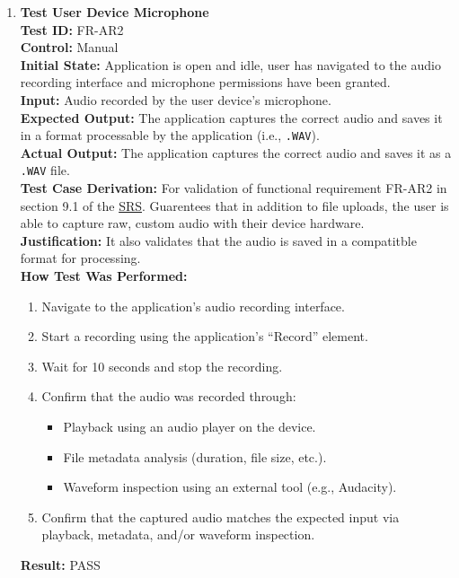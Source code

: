\documentclass[12pt, titlepage]{article}
\begin{document}
\begin{enumerate}
  \item \textbf{Test User Device Microphone} \\
  \newline
  \textbf{Test ID:} FR-AR2 \\
  \textbf{Control:} Manual \\
  \textbf{Initial State:} Application is open and idle, user has navigated to the audio recording interface and microphone 
  permissions have been granted. \\
  \textbf{Input:} Audio recorded by the user device’s microphone. \\
  \textbf{Expected Output:} The application captures the correct audio and saves it in a format processable by the application 
  (i.e., \texttt{.WAV}). \\
  \textbf{Actual Output:} The application captures the correct audio and saves it as a \texttt{.WAV} file. \\
  \textbf{Test Case Derivation:} For validation of functional requirement FR-AR2 in section 9.1 of the 
  \href{https://github.com/emilyperica/ScoreGen/blob/main/docs/SRS-Volere/SRS.pdf}{SRS}. Guarentees that in addition to file uploads, 
  the user is able to capture raw, custom audio with their device hardware. \\
  \textbf{Justification:} It also validates that the audio is saved in a compatitble format for processing.\\
  \textbf{How Test Was Performed:}
  \begin{enumerate}
      \item Navigate to the application’s audio recording interface.
      \item Start a recording using the application’s “Record” element.
      \item Wait for 10 seconds and stop the recording.
      \item Confirm that the audio was recorded through:
      \begin{itemize}
          \item Playback using an audio player on the device.
          \item File metadata analysis (duration, file size, etc.).
          \item Waveform inspection using an external tool (e.g., Audacity).
      \end{itemize}
      \item Confirm that the captured audio matches the expected input via playback, metadata, and/or waveform inspection.
  \end{enumerate}
  \textbf{Result:} PASS
  

\end{enumerate}
\end{document}

